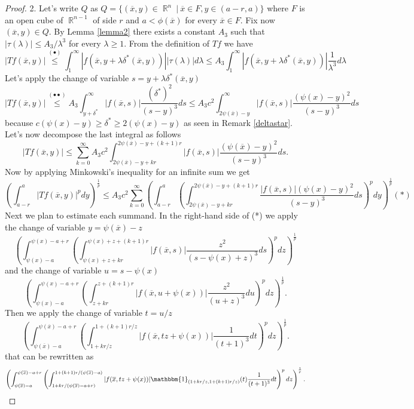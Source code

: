 \documentclass[12pt]{article}
\theoremstyle{definition}
\DeclareMathOperator\rr{\mathbb{R}}
\begin{document}
\begin{proof}
2. Let's write $Q$ as $Q=\{ (\overline x,y) \in \rr^n \ | \ \overline x \in F, y \in (a-r,a) \}$ where $F$ is an open cube of $\rr^{n-1}$ of side $r$ and $a<\phi(\overline x)$ for every $\overline x \in F$. Fix now $(\overline x, y) \in Q$. By Lemma \ref{lemma2} there exists a constant $A_3$ such that $|\tau(\lambda)|\le A_3/\lambda^3$  for every $\lambda \ge 1.$ From the definition of $Tf$ we have
\[ |Tf(\overline x,y)| \overset{(\bullet)}\le\int_1^\infty |f(\overline x, y+\lambda \delta^*(\overline x,y))||\tau(\lambda)|d\lambda \le A_3 \int_1^\infty |f(\overline x, y+\lambda \delta^*(\overline x,y))|\frac{1}{\lambda^3}d\lambda\]
Let's apply the change of variable $s=y+\lambda \delta^*(\overline x,y)$
\[ |Tf(\overline x,y)|\overset{(\bullet \bullet)}\le A_3\int_{y+\delta^*}^\infty |f(\overline x, s)|\frac{(\delta^*)^2}{(s-y)^3}ds\le A_3 c^2 \int_{2\psi(\overline x)-y}^\infty |f(\overline x, s)|\frac{(\psi(x)-y)^2}{(s-y)^3}ds\]
because $c(\psi(x)-y)\ge\delta^*\ge 2(\psi(x)-y)$ as seen in Remark \ref{deltastar}. Let's now decompose the last integral as follows
\[ |Tf(\overline x,y)|\le \sum_{k=0}^\infty A_3c^2\int_{2\psi(\overline x)-y+kr}^{2\psi(\overline x)-y+(k+1)r} |f(\overline x, s)|\frac{(\psi(\overline x)-y)^2}{(s-y)^3}ds.\]
Now by applying Minkowski's inequality for an infinite sum we get
\[ \left(\int_{a-r}^{a}|Tf(\overline x,y)|^p dy\right)^{\frac{1}{p}}\le A_3 c^2\sum_{k=0}^\infty \left( \int_{a-r}^{a}\left ( \int_{2\psi(\overline x)-y+kr}^{2\psi(\overline x)-y+(k+1)r} \frac{|f(\overline x, s)|(\psi(x)-y)^2}{(s-y)^3}ds\right)^pdy \right)^{\frac{1}{p}} (*)\]
Next we plan to estimate each summand. In the right-hand side of (*) we apply the change of variable $y=\psi(\overline x)-z$ 
\[ \left( \int_{\psi(x)-a}^{\psi(x)-a+r}\left (\int_{\psi(x)+z+kr}^{\psi(x)+z+(k+1)r} |f(\overline x, s)|\frac{z^2}{(s-\psi(x)+z)^3}ds\right)^pdz \right)^{\frac{1}{p}}\]
and the change of variable $u=s-\psi(x)$
\[ \left( \int_{\psi(x)-a}^{\psi(x)-a+r}\left (\int_{z+kr}^{z+(k+1)r} |f(\overline x, u+\psi(x))|\frac{z^2}{(u+z)^3}du\right)^pdz \right)^{\frac{1}{p}}.\]
Then we apply the change of variable $t=u/z$
\[ \left( \int_{\psi(\overline x) - a}^{\psi(\overline x) -a+r}\left (\int_{1+kr/z}^{1+(k+1)r/z} |f(\overline x, tz+\psi(x))|\frac{1}{(t+1)^3}dt\right)^pdz \right)^{\frac{1}{p}}.\]
that can be rewritten as
 \[  \left( \int_{\psi(\overline x) -a}^{\psi(\overline x) -a+r}\left (\int_{1+kr/(\psi(\overline x) -a+r)}^{1+(k+1)r/(\psi(\overline x)-a)} |f(\overline x, tz+\psi(x))|\mathbbm{1}_{(1+kr/z,  1+(k+1)r/z ) }(t)\frac{1}{(t+1)^3}dt\right)^pdz \right)^{\frac{1}{p}}.\]

\end{proof}
\end{document}
